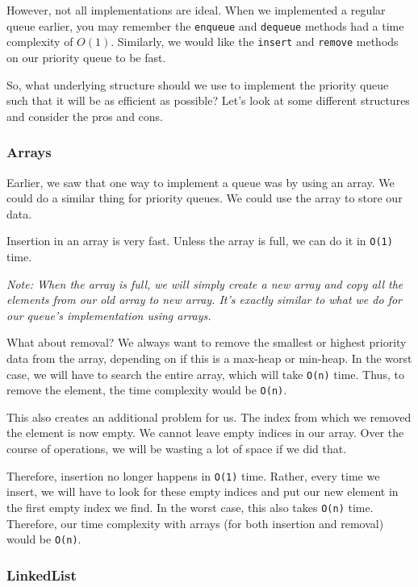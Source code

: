 \documentclass[11pt]{article}
\begin{document}
However, not all implementations are ideal. When we implemented a
regular queue earlier, you may remember the \texttt{enqueue} and
\texttt{dequeue} methods had a time complexity of \(O(1)\). Similarly,
we would like the \texttt{insert} and \texttt{remove} methods on our
priority queue to be fast.

So, what underlying structure should we use to implement the priority
queue such that it will be as efficient as possible? Let's look at some
different structures and consider the pros and cons.

    \subsubsection{Arrays}\label{arrays}

Earlier, we saw that one way to implement a queue was by using an array.
We could do a similar thing for priority queues. We could use the array
to store our data.

Insertion in an array is very fast. Unless the array is full, we can do
it in \texttt{O(1)} time.

\emph{Note: When the array is full, we will simply create a new array
and copy all the elements from our old array to new array. It's exactly
similar to what we do for our queue's implementation using arrays.}

What about removal? We always want to remove the smallest or highest
priority data from the array, depending on if this is a max-heap or
min-heap. In the worst case, we will have to search the entire array,
which will take \texttt{O(n)} time. Thus, to remove the element, the
time complexity would be \texttt{O(n)}.

This also creates an additional problem for us. The index from which we
removed the element is now empty. We cannot leave empty indices in our
array. Over the course of operations, we will be wasting a lot of space
if we did that.

Therefore, insertion no longer happens in \texttt{O(1)} time. Rather,
every time we insert, we will have to look for these empty indices and
put our new element in the first empty index we find. In the worst case,
this also takes \texttt{O(n)} time. Therefore, our time complexity with
arrays (for both insertion and removal) would be \texttt{O(n)}.

    \subsubsection{LinkedList}\label{linkedlist}
\end{document}
